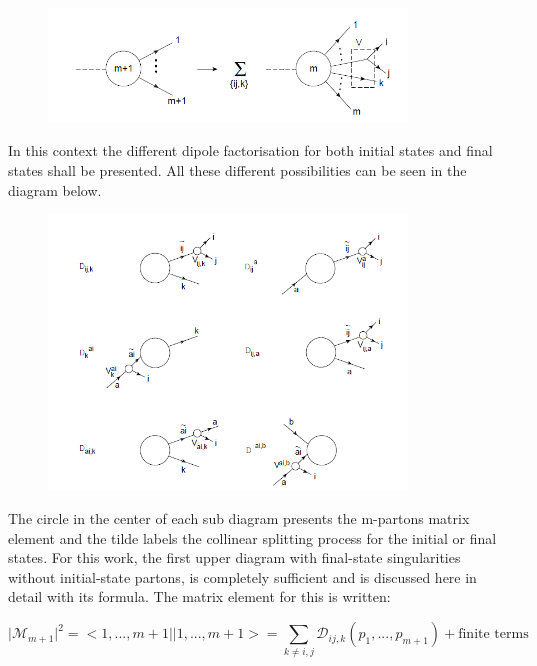 \begin{figure}[h!]
\centering
\includegraphics[width=0.85\textwidth]{images/Intro/factorisationPic2.png}
\end{figure}

In this context the different dipole factorisation for both initial states and final states shall be presented. All these different possibilities can be seen in the diagram below.

\begin{figure}[h!]
\centering
\includegraphics[width=0.85\textwidth]{images/Intro/Dipole.png}
\end{figure}

The circle in the center of each sub diagram presents the m-partons matrix element and the tilde labels the collinear splitting process for the initial or final states.
For this work, the first upper diagram with final-state singularities without initial-state partons, is completely sufficient and is discussed here in detail with its formula.
The matrix element for this is written:

\begin{equation}
\vert {{\mathcal{M}}}_{m+1}  \vert^2 = < 1,...,m+1 || 1,...,m+1 > = \sum_{k \neq i,j} {{\mathcal{D}}}_{ij,k}(p_1,...,p_{m+1}) +\text{finite terms}
\end{equation}

